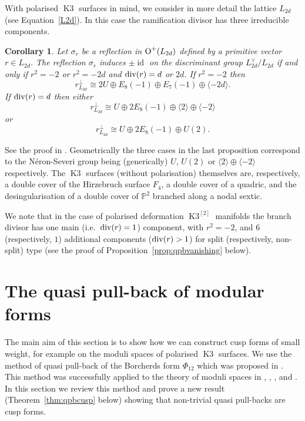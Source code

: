 \documentclass[a4paper,11pt]{article}
\newtheorem{corollary}[lemma]{Corollary}
\newcommand{\PP}{\mathbb P}
\newcommand{\Orth}{\mathop{\null\mathrm {O}}\nolimits}
\newcommand{\id}{\mathop{\mathrm {id}}\nolimits}
\newcommand{\divv}{\mathop{\null\mathrm {div}}\nolimits}
\newcommand{\latt}[1]{{\langle{#1}\rangle}}
\newcommand{\Kthree}{\mathop{\mathrm {K3}}\nolimits}
\begin{document}
With polarised $\Kthree$ surfaces in mind, we consider in more detail
the lattice $L_{2d}$ (see Equation~\eqref{L2d}). In this case the
ramification divisor has three irreducible components.
\begin{corollary}\label{cor:reflK3}
Let $\sigma_r$ be a reflection in $\Orth^+(L_{2d})$ defined by a
primitive vector $r\in L_{2d}$.  The reflection $\sigma_r$ induces
$\pm\id$ on the discriminant group $L_{2d}^\vee/L_{2d}$ if and only if
$r^2=-2$ or $r^2=- 2d$ and $\divv(r)=d$ or $2d$.  If $r^2=-2$ then
\begin{equation*}
r^\perp_{L_{2d}}\cong 2U\oplus E_8(-1)\oplus E_7(-1)\oplus \latt{-2d}.
\end{equation*}
If $\divv(r)=d$ then either
\begin{equation*}
r^\perp_{L_{2d}}\cong U\oplus 2E_8(-1)\oplus \latt{2} \oplus \latt{-2}
\end{equation*}
or
\begin{equation*}
r^\perp_{L_{2d}}\cong U\oplus 2E_8(-1)\oplus U(2).
\end{equation*}
\end{corollary}

See the proof in \cite[Corollary 3.4 and Proposition 3.6]{GHSK3}.
Geometrically the three cases in the last proposition correspond to
the N\'eron-Severi group being (generically) $U$, $U(2)$ or
$\latt{2}\oplus\latt{-2}$ respectively. The $\Kthree$ surfaces
(without polarisation) themselves are, respectively, a double cover of
the Hirzebruch surface $F_4$, a double cover of a quadric, and the
desingularisation of a double cover of $\PP^2$ branched along a nodal
sextic.

We note that in the case of polarised deformation $\Kthree^{[2]}$
manifolds the branch divisor has one main (i.e.\ $\divv(r)=1$)
component, with $r^2=-2$, and $6$ (respectively, $1$) additional
components ($\divv(r)>1$) for split (respectively, non-split) type
(see the proof of Proposition~\ref{prop:qpbvanishing} below).


\section{The quasi pull-back of modular forms}\label{sect:quasipb}

The main aim of this section is to show how we can construct cusp
forms of small weight, for example on the moduli spaces of polarised
$\Kthree$ surfaces.  We use the method of quasi pull-back of the
Borcherds form $\Phi_{12}$ which was proposed in \cite[pp.
200-201]{B1}.  This method was successfully applied to the theory of
moduli spaces in \cite{BKPS}, \cite{Ko2}, \cite{GHSK3}, \cite{GHSsymp}
and \cite{GHSdim21}.  In this section we review this method and prove
a new result (Theorem~\ref{thm:qpbcusp} below) showing that non-trivial quasi
pull-backs are cusp forms.
\end{document}
